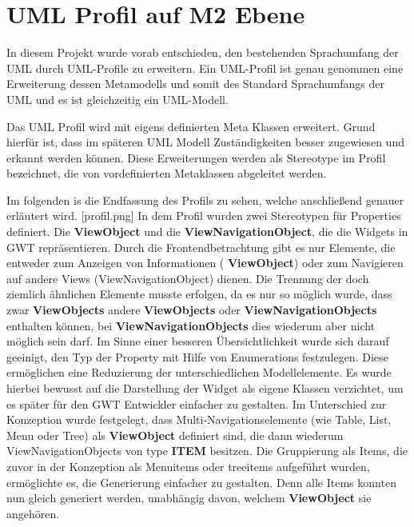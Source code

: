 \chapter{UML Profil auf M2 Ebene}
\label{UMLProfil}
In diesem Projekt wurde vorab entschieden, den bestehenden Sprachumfang der UML durch UML-Profile zu erweitern. Ein UML-Profil ist genau genommen eine Erweiterung dessen Metamodells und somit des Standard Sprachumfangs der UML und es ist gleichzeitig ein UML-Modell.

Das UML Profil wird mit eigens definierten Meta Klassen erweitert. Grund hierfür ist, dass im späteren UML Modell Zuständigkeiten besser zugewiesen und erkannt werden können.
Diese Erweiterungen werden als Stereotype im Profil bezeichnet, die von vordefinierten Metaklassen abgeleitet werden.

Im folgenden is die Endfassung des Profils zu sehen, welche anschließend genauer erläutert wird.
[profil.png]
In dem Profil wurden zwei Stereotypen für Properties definiert. Die \textbf{ViewObject} und die \textbf{ViewNavigationObject}, die die Widgets in GWT repräsentieren. Durch die Frontendbetrachtung gibt es nur Elemente, die entweder zum Anzeigen von Informationen ( \textbf{ViewObject}) oder zum Navigieren auf andere Views (ViewNavigationObject) dienen. Die Trennung der doch ziemlich ähnlichen Elemente musste erfolgen, da es nur so möglich wurde, dass zwar  \textbf{ViewObjects} andere  \textbf{ViewObjects} oder  \textbf{ViewNavigationObjects} enthalten können, bei  \textbf{ViewNavigationObjects} dies wiederum aber nicht möglich sein darf. 
Im Sinne einer besseren Übersichtlichkeit wurde sich darauf geeinigt, den Typ der Property mit Hilfe von Enumerations festzulegen. Diese ermöglichen eine Reduzierung der unterschiedlichen Modellelemente. Es wurde hierbei bewusst auf die Darstellung der Widget als eigene Klassen verzichtet, um es später für den GWT Entwickler einfacher zu gestalten. Im Unterschied zur Konzeption wurde festgelegt, dass Multi-Navigationselemente (wie Table, List, Menu oder Tree) als  \textbf{ViewObject} definiert sind, die dann wiederum ViewNavigationObjects von type  \textbf{ITEM} besitzen. Die Gruppierung als Items, die zuvor in der Konzeption als Menuitems oder treeitems aufgeführt wurden, ermöglichte es, die Generierung einfacher zu gestalten. Denn alle Items konnten nun gleich generiert werden, unabhängig davon, welchem  \textbf{ViewObject} sie angehören.

